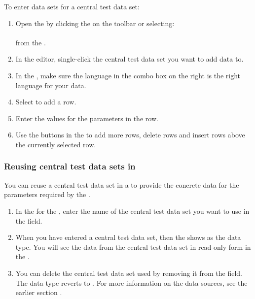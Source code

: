 To enter data sets for a central test data set:
\begin{enumerate}
\item Open the  \gddataeditor{} by clicking the  on the toolbar or selecting:\\
\\
from the \gdtestsuitebrowser{}.
\item In the editor, single-click the central test data set you want to add data to.
\item In the \gddatasetsview{}, make sure the language in the combo box on the right is the right language for your data. 
\item Select  to add a row. 
\item Enter the values for the parameters in the row. 
\item Use the buttons in the \gddatasetsview{} to  add more rows, delete rows and insert rows above the currently selected row. 
\end{enumerate}

\subsubsection{Reusing central test data sets in \gdcases{}}
\label{TasksCentralDataReference}

You can reuse a central test data set in a \gdcase{} to provide the concrete data for the parameters required by the \gdcase{}. 

\begin{enumerate}
\item In the \gdpropview{} for the \gdcase{}, enter the name of the central test data set you want to use in the   field. 
\item When you have entered a central test data set, then the \gdpropview{} shows  as the data type. You will see the data from the central test data set in read-only form in the \gddatasetsview{}.
\item You can delete the central test data set used by removing it from the  field. The data type reverts to .
For more information on the data sources, see the earlier section .
\end{enumerate}
